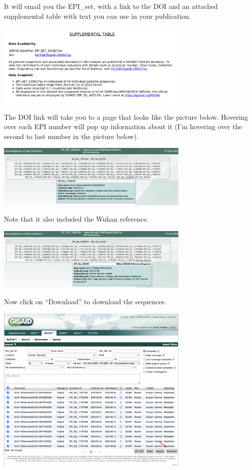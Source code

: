 \documentclass[
]{book}
\begin{document}
It will email you the EPI\_set, with a link to the DOI and an attached supplemental table with text you can use in your publication.

\includegraphics[width=0.7\textwidth,height=\textheight]{./Figures/SuppTable.png}

The DOI link will take you to a page that looks like the picture below. Hovering over each EPI number will pop up information about it (I'm hovering over the second to last number in the picture below).

\includegraphics[width=0.7\textwidth,height=\textheight]{./Figures/AckDen.png}

Note that it also included the Wuhan reference.

\includegraphics[width=0.7\textwidth,height=\textheight]{./Figures/AckWuhan.png}

Now click on ``Download'' to download the sequences.

\includegraphics[width=0.7\textwidth,height=\textheight]{./Figures/download.png}
\end{document}
